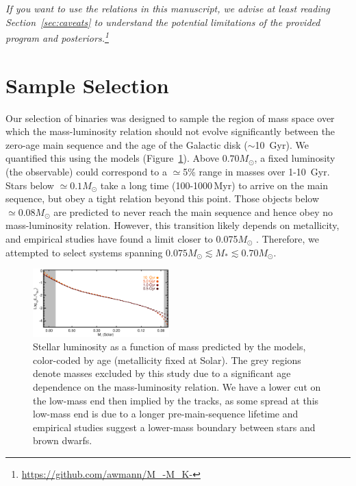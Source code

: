 \documentclass[twocolumn]{aastex62}
\begin{document}
\textit{If you want to use the relations in this manuscript, we advise at least reading Section~\ref{sec:caveats} to understand the potential limitations of the provided program and posteriors.\footnote{\href{https://github.com/awmann/M_-M_K-}{https://github.com/awmann/M\_-M\_K-}}}%


\section{Sample Selection}\label{sec:targets}
Our selection of binaries was designed to sample the region of mass space over which the mass-luminosity relation should not evolve significantly between the zero-age main sequence and the age of the Galactic disk ($\sim$10~Gyr). We quantified this using the \citet{BHAC15} models (Figure~\ref{fig:age}). Above $0.70M_\odot$, a fixed luminosity (the observable) could correspond to a $\simeq$5\% range in masses over 1-10\, Gyr. Stars below $\simeq0.1M_\odot$ take a long time (100-1000\,Myr) to arrive on the main sequence, but obey a tight relation beyond this point. Those objects below $\simeq0.08M_\odot$ are predicted to never reach the main sequence and hence obey no mass-luminosity relation. However, this transition likely depends on metallicity, and empirical studies have found a limit closer to 0.075$M_\odot$ \citep[e.g.,][]{Dieterich2014,Dupuy2017}. Therefore, we attempted to select systems spanning $0.075M_\odot \lesssim M_* \lesssim 0.70M_\odot$.

\begin{figure}[htb]
\begin{center}
\includegraphics[width=0.47\textwidth]{Model_age2.eps}
\caption{Stellar luminosity as a function of mass predicted by the \citet{BHAC15} models, color-coded by age (metallicity fixed at Solar). The grey regions denote masses excluded by this study due to a significant age dependence on the mass-luminosity relation. We have a lower cut on the low-mass end then implied by the tracks, as some spread at this low-mass end is due to a longer pre-main-sequence lifetime and empirical studies suggest a lower-mass boundary between stars and brown dwarfs. }
\label{fig:age}
\end{center}
\end{figure}
\end{document}
